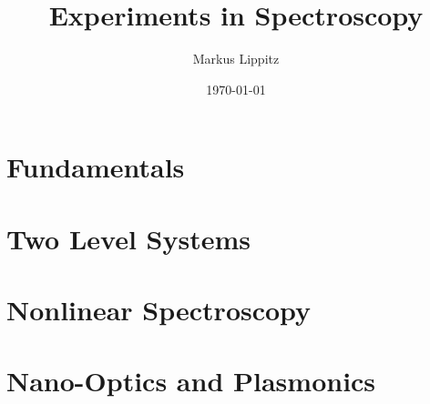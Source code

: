 \documentclass[notoc,nofonts,a4paper,twoside,nobib]{tufte-book}
\begin{document}
  \tikzexternaldisable


\title{Experiments in Spectroscopy}

\author{Markus Lippitz}
\date{\today}


\maketitle


%
\tableofcontents

%

%
\part{Fundamentals}






%
\part{Two Level Systems}



%


\part{Nonlinear Spectroscopy}






%

\part{Nano-Optics and Plasmonics}


\end{document}
